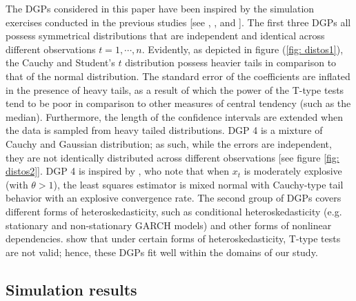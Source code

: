 \documentclass[harvard,11pt]{article}
\begin{document}
The DGPs considered in this paper have been inspired by the simulation exercises conducted in the previous studies [see \citet{mankiw1986we}, \citet{dufour1995exact}, \citet{coudin2009finite} and \citet{dufour2010exact}]. The first three DGPs all possess symmetrical distributions that are independent and identical across different observations $t=1,\cdots,n$. Evidently, as depicted in figure (\ref{fig: distos1}), the Cauchy and Student's $t$ distribution possess heavier tails in comparison to that of the normal distribution. The standard error of the coefficients are inflated in the presence of heavy tails, as a result of which the power of the T-type tests tend to be poor in comparison to other measures of central tendency (such as the median). Furthermore, the length of the confidence intervals are extended when the data is sampled from heavy tailed distributions. DGP 4 is a mixture of Cauchy and Gaussian distribution; as such, while the errors are independent, they are not identically distributed across different observations [see figure \ref{fig: distos2}]. DGP 4 is inspired by \citet{magdalinos2009limit}, who note that when $x_t$ is moderately explosive (with $\theta>1$), the least squares estimator is mixed normal with Cauchy-type tail behavior with an explosive convergence rate. The second group of DGPs covers different forms of heteroskedasticity, such as conditional heteroskedasticity (e.g. stationary and non-stationary GARCH models) and other forms of nonlinear dependencies. \citet{dufour2010exact} show that under certain forms of heteroskedasticity, T-type tests are not valid; hence, these DGPs fit well within the domains of our study.  

\subsection{Simulation results \label{sec: Simulation results}}
\end{document}
